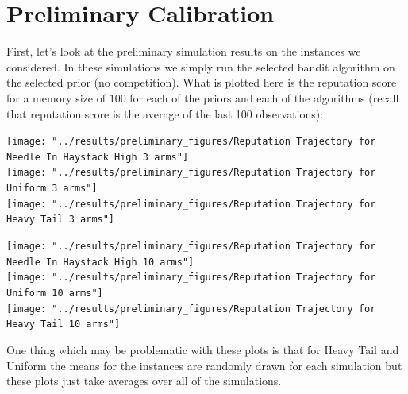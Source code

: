 \documentclass[11pt,letterpaper]{article}
\begin{document}
\section*{Preliminary Calibration}

First, let's look at the preliminary simulation results on the instances we considered. In these simulations we simply run the selected bandit algorithm on the selected prior (no competition).  What is plotted here is the reputation score for a memory size of $100$ for each of the priors and each of the algorithms (recall that reputation score is the average of the last 100 observations):

\texttt{[image: "../results/preliminary\_figures/Reputation Trajectory for Needle In Haystack High 3 arms"]} \\
\texttt{[image: "../results/preliminary\_figures/Reputation Trajectory for Uniform 3 arms"]} \\
\texttt{[image: "../results/preliminary\_figures/Reputation Trajectory for Heavy Tail 3 arms"]}

\texttt{[image: "../results/preliminary\_figures/Reputation Trajectory for Needle In Haystack High 10 arms"]} \\
\texttt{[image: "../results/preliminary\_figures/Reputation Trajectory for Uniform 10 arms"]} \\
\texttt{[image: "../results/preliminary\_figures/Reputation Trajectory for Heavy Tail 10 arms"]}

One thing which may be problematic with these plots is that for Heavy Tail and Uniform the means for the instances are randomly drawn for each simulation but these plots just take averages over all of the simulations.
\end{document}
